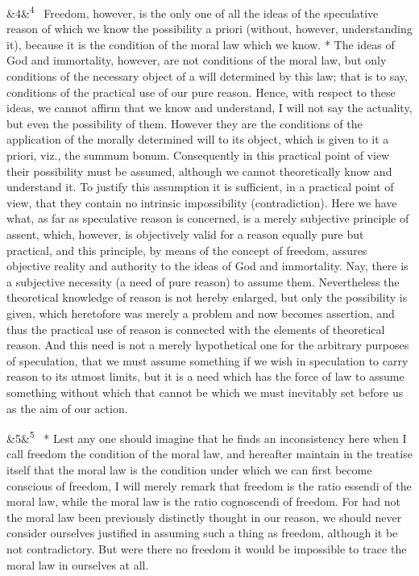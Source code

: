 \documentclass[12pt]{article}
\newcommand{\para}[1][]{\par\noindent\ifx&#1&\else\textsuperscript{\footnotesize #1}~\fi}
\begin{document}
\para[4] Freedom, however, is the only one of all the ideas of the speculative reason of which we know the possibility a priori (without, however, understanding it), because it is the condition of the moral law which we know. * The ideas of God and immortality, however, are not conditions of the moral law, but only conditions of the necessary object of a will determined by this law; that is to say, conditions of the practical use of our pure reason. Hence, with respect to these ideas, we cannot affirm that we know and understand, I will not say the actuality, but even the possibility of them. However they are the conditions of the application of the morally determined will to its object, which is given to it a priori, viz., the summum bonum. Consequently in this practical point of view their possibility must be assumed, although we cannot theoretically know and understand it. To justify this assumption it is sufficient, in a practical point of view, that they contain no intrinsic impossibility (contradiction). Here we have what, as far as speculative reason is concerned, is a merely subjective principle of assent, which, however, is objectively valid for a reason equally pure but practical, and this principle, by means of the concept of freedom, assures objective reality and authority to the ideas of God and immortality. Nay, there is a subjective necessity (a need of pure reason) to assume them. Nevertheless the theoretical knowledge of reason is not hereby enlarged, but only the possibility is given, which heretofore was merely a problem and now becomes assertion, and thus the practical use of reason is connected with the elements of theoretical reason. And this need is not a merely hypothetical one for the arbitrary purposes of speculation, that we must assume something if we wish in speculation to carry reason to its utmost limits, but it is a need which has the force of law to assume something without which that cannot be which we must inevitably set before us as the aim of our action.

\para[5] * Lest any one should imagine that he finds an inconsistency here when I call freedom the condition of the moral law, and hereafter maintain in the treatise itself that the moral law is the condition under which we can first become conscious of freedom, I will merely remark that freedom is the ratio essendi of the moral law, while the moral law is the ratio cognoscendi of freedom. For had not the moral law been previously distinctly thought in our reason, we should never consider ourselves justified in assuming such a thing as freedom, although it be not contradictory. But were there no freedom it would be impossible to trace the moral law in ourselves at all.
\end{document}
